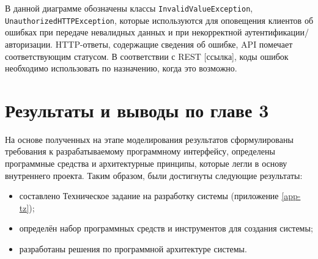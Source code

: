 	В данной диаграмме обозначены классы \texttt{InvalidValueException}, \texttt{UnauthorizedHTTPException}, которые используются для оповещения клиентов об ошибках при передаче невалидных данных и при некорректной аутентификации/авторизации. HTTP-ответы, содержащие сведения об ошибке, API помечает соответствующим статусом. В соответствии с REST [ссылка], коды ошибок необходимо использовать по назначению, когда это возможно.

	\pagebreak

\section{Результаты и выводы по главе 3}

\par
	
	На основе полученных на этапе моделирования результатов сформулированы требования к разрабатываемому программному интерфейсу, определены программные средства и архитектурные принципы, которые легли в основу внутреннего проекта. Таким образом, были достигнуты следующие результаты:

	\begin{itemize}
		\item составлено Техническое задание на разработку системы (приложение \ref{app-tz});
		\item определён набор программных средств и инструментов для создания системы;
		\item разработаны решения по программной архитектуре системы.
	\end{itemize}
